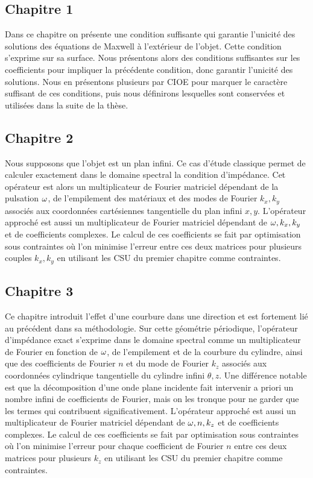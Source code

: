 \subsection*{Chapitre 1}
Dans ce chapitre on présente une condition suffisante qui garantie l'unicité des solutions des équations de Maxwell à l'extérieur de l'objet.
Cette condition s'exprime sur sa surface. Nous présentons alors des conditions suffisantes sur les coefficients pour impliquer la précédente condition, donc garantir l'unicité des solutions.
Nous en présentons plusieurs par CIOE pour marquer le caractère suffisant de ces conditions, puis nous définirons lesquelles sont conservées et utilisées dans la suite de la thèse.

\subsection*{Chapitre 2}
Nous supposons que l'objet est un plan infini. Ce cas d'étude classique permet de calculer exactement dans le domaine spectral la condition d’impédance.
Cet opérateur est alors un multiplicateur de Fourier matriciel dépendant de la pulsation \(\omega\), de l'empilement des matériaux et des modes de Fourier \(k_x, k_y\) associés aux coordonnées cartésiennes tangentielle du plan infini \(x,y\).
L'opérateur approché est aussi un multiplicateur de Fourier matriciel dépendant de \(\omega, k_x, k_y\) et de coefficients complexes.
Le calcul de ces coefficients se fait par optimisation sous contraintes où l'on minimise l'erreur entre ces deux matrices pour plusieurs couples \(k_x,k_y\) en utilisant les CSU du premier chapitre comme contraintes.

\subsection*{Chapitre 3}
Ce chapitre introduit l'effet d'une courbure dans une direction et est fortement lié au précédent dans sa méthodologie.
Sur cette géométrie périodique, l'opérateur d'impédance exact s'exprime dans le domaine spectral comme un multiplicateur de Fourier en fonction de \(\omega\), de l'empilement et de la courbure du cylindre, ainsi que des coefficients de Fourier \(n\) et du mode de Fourier \(k_z\) associés aux coordonnées cylindrique tangentielle du cylindre infini \(\theta,z\).
Une différence notable est que la décomposition d'une onde plane incidente fait intervenir a priori un nombre infini de coefficients de Fourier, mais on les tronque pour ne garder que les termes qui contribuent significativement.
L'opérateur approché est aussi un multiplicateur de Fourier matriciel dépendant de \(\omega, n, k_z\) et de coefficients complexes.
Le calcul de ces coefficients se fait par optimisation sous contraintes où l'on minimise l'erreur pour chaque coefficient de Fourier \(n\) entre ces deux matrices pour plusieurs \(k_z\) en utilisant les CSU du premier chapitre comme contraintes.

